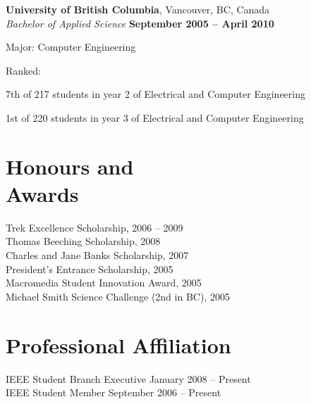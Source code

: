 \documentclass[margin,line]{resume}
\begin{document}
\begin{resume}
    \textbf{University of British Columbia}, Vancouver, BC, Canada
        \vspace{2mm}\\\vspace{1mm}%
    \textsl{Bachelor of Applied Science} \hfill \textbf{September 2005 -- April 2010}
        \vspace{-3mm}\\\vspace{-1mm}%
    \begin{list2}
        \item Major: Computer Engineering
        \item Ranked:
        \begin{list3}
            \item 7th of 217 students in year 2 of Electrical and Computer Engineering
            \item 1st of 220 students in year 3 of Electrical and Computer Engineering
        \end{list3}
    \end{list2}
    \vspace{-1.5mm}

    \section{\mysidestyle Honours and\\Awards} 

    Trek Excellence Scholarship, 2006 -- 2009
        \vspace{1mm}\\%
    Thomas Beeching Scholarship, 2008
        \vspace{1mm}\\%
    Charles and Jane Banks Scholarship, 2007
        \vspace{1mm}\\%
    President's Entrance Scholarship, 2005
        \vspace{1mm}\\%
    Macromedia Student Innovation Award, 2005
        \vspace{1mm}\\%
    Michael Smith Science Challenge (2nd in BC), 2005

    \section{\mysidestyle Professional Affiliation}
    IEEE Student Branch Executive \hfill January 2008 -- Present\vspace{1mm}\\
    IEEE Student Member \hfill September 2006 -- Present


\end{resume}
\end{document}
